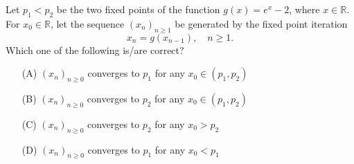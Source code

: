     \bigskip

    \item Let $p_1 < p_2$ be the two fixed points of the function $g(x) = e^x - 2$, where $x \in \mathbb{R}$. For $x_0 \in \mathbb{R}$, let the sequence $(x_n)_{n \geq 1}$ be generated by the fixed point iteration
    \[
    x_n = g(x_{n-1}), \quad n \geq 1.
    \]
    Which one of the following is/are correct?
    \begin{enumerate}
        \item[(A)] $(x_n)_{n \geq 0}$ converges to $p_1$ for any $x_0 \in (p_1, p_2)$
        \item[(B)] $(x_n)_{n \geq 0}$ converges to $p_2$ for any $x_0 \in (p_1, p_2)$
        \item[(C)] $(x_n)_{n \geq 0}$ converges to $p_2$ for any $x_0 > p_2$
        \item[(D)] $(x_n)_{n \geq 0}$ converges to $p_1$ for any $x_0 < p_1$
    \end{enumerate}

